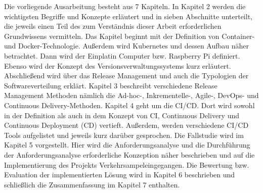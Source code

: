 Die vorliegende Ausarbeitung besteht aus 7 Kapiteln. In Kapitel 2 werden die wichtigsten Begriffe und Konzepte erläutert und in sieben Abschnitte unterteilt, die jeweils einen Teil des zum Verständnis dieser Arbeit erforderlichen Grundwissens vermitteln. Das Kapitel beginnt mit der Definition von Container- und Docker-Technologie. Außerdem wird Kubernetes und dessen Aufbau näher betrachtet. Dann wird der Einplatin Computer bzw. Raspberry Pi definiert. Ebenso wird der Konzept des Versionsverwaltungssystems kurz erläutert. Abschließend wird über das Release Management und auch die Typologien der Softwareverteilung erklärt.
\newline\newline
Kapitel 3 beschreibt verschiedene Release Management Methoden nämlich die Ad-hoc-, Inkrementelle-, Agile-, DevOps- und Continuous Delivery-Methoden.
\newline\newline
Kapitel 4 geht um die \ac{CI/CD}. Dort wird sowohl in der Definition als auch in dem Konzept von \ac{CI}, Continuous Delivery und Continuous Deployment (CD) vertieft. Außerdem, werden verschiedene CI/CD Tools aufgelistet und jeweils kurz darüber gesprochen.
\newline\newline
Die Fallstudie wird im Kapitel 5 vorgestellt. Hier wird die Anforderungsanalyse und die Durchführung der Anforderungsanalyse erforderliche Konzeption näher beschrieben und auf die Implementierung des Projekts \glqq Verkehrsampel\grqq eingegangen.
\newline\newline
Die Bewertung bzw. Evaluation der implementierten Lösung wird in Kapitel 6 beschrieben und schließlich die Zusammenfassung im Kapitel 7 enthalten.
